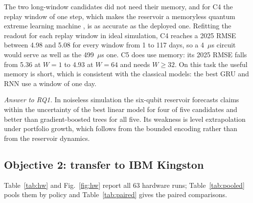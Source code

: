 \documentclass[journal]{IEEEtran}
\begin{document}
The two long-window candidates did not need their memory, and for C4 the replay window of one step, which makes the reservoir a memoryless quantum extreme learning machine \cite{Innocenti2023QELM}, is as accurate as the deployed one. Refitting the readout for each replay window in ideal simulation, C4 reaches a 2025 RMSE between 4.98 and 5.08 for every window from 1 to 117 days, so a 4~$\mu$s circuit would serve as well as the 499~$\mu$s one. C5 does use memory: its 2025 RMSE falls from 5.36 at $W=1$ to 4.93 at $W=64$ and needs $W\ge32$. On this task the useful memory is short, which is consistent with the classical models: the best GRU and RNN use a window of one day.

\emph{Answer to RQ1.} In noiseless simulation the six-qubit reservoir forecasts claims within the uncertainty of the best linear model for four of five candidates and better than gradient-boosted trees for all five. Its weakness is level extrapolation under portfolio growth, which follows from the bounded encoding rather than from the reservoir dynamics.

\subsection{Objective 2: transfer to IBM Kingston}
Table~\ref{tab:hw} and Fig.~\ref{fig:hw} report all 63 hardware runs; Table~\ref{tab:pooled} pools them by policy and Table~\ref{tab:paired} gives the paired comparisons.
\end{document}
